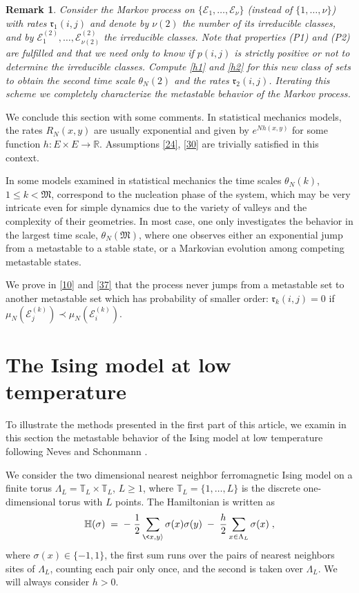 \documentclass[reqno]{amsart}
\newtheorem{remark}[theorem]{Remark}
\begin{document}
\begin{remark}
{Consider the Markov process on $\{{{\mathcal E}}_1, \dots, {{\mathcal E}}_\nu\}$
(instead of $\{1, \dots, \nu\}$) with rates ${{\mathfrak r}}_1(i,j)$ and denote
by $\nu(2)$ the number of its irreducible classes, and by ${{\mathcal E}}^{(2)}_1, \dots, {{\mathcal E}}^{(2)}_{\nu(2)}$ the irreducible classes. Note
that properties (P1) and (P2) are fulfilled and that we need only to
know if $p(i,j)$ is strictly positive or not to determine the
irreducible classes.  Compute \eqref{h1} and \eqref{h2} for this new
class of sets to obtain the second time scale $\theta_N(2)$ and the
rates ${{\mathfrak r}}_2(i,j)$. Iterating this scheme we completely characterize
the metastable behavior of the Markov process.}
\end{remark}

We conclude this section with some comments.  In statistical mechanics
models, the rates $R_N(x,y)$ are usually exponential and given by
$e^{N h(x,y)}$ for some function $h:E\times E \to {{\mathbb R}}$. Assumptions
\eqref{24}, \eqref{30} are trivially satisfied in this context.

In some models examined in statistical mechanics the time scales
$\theta_N(k)$, $1\le k < {{\mathfrak M}}$, correspond to the nucleation phase of
the system, which may be very intricate even for simple dynamics due
to the variety of valleys and the complexity of their geometries. In
most case, one only investigates the behavior in the largest time
scale, $\theta_N({{\mathfrak M}})$, where one observes either an exponential
jump from a metastable to a stable state, or a Markovian evolution
among competing metastable states.
 

We prove in \eqref{10} and \eqref{37} that the process never jumps
from a metastable set to another metastable set which has probability
of smaller order: ${{\mathfrak r}}_k(i,j)=0$ if $\mu_N({{\mathcal E}}^{(k)}_j) \prec
\mu_N({{\mathcal E}}^{(k)}_i)$.

\section{The Ising model at low temperature}
\label{si1}

To illustrate the methods presented in the first part of this article,
we examin in this section the metastable behavior of the Ising model
at low temperature following Neves and Schonmann \cite{ns1}.

We consider the two dimensional nearest neighbor ferromagnetic Ising
model on a finite torus $\Lambda_L = {{\mathbb T}}_L \times {{\mathbb T}}_L$, $L\ge
1$, where ${{\mathbb T}}_L = \{1, \dots, L\}$ is the discrete one-dimensional
torus with $L$ points. The Hamiltonian is written as
\begin{equation*}
{{\mathbb H}} (\sigma) \; =\; -\; \frac 12 \sum_{\<x,y{\rangle}} \sigma(x) \sigma(y)
\;-\; \frac h2 \sum_{x\in \Lambda_L} \sigma(x) \; ,
\end{equation*}
where $\sigma (x) \in \{ -1, 1\}$, the first sum runs over the pairs
of nearest neighbors sites of $\Lambda_L$, counting each pair only
once, and the second is taken over $\Lambda_L$. We will always
consider $h > 0$.
\end{document}
